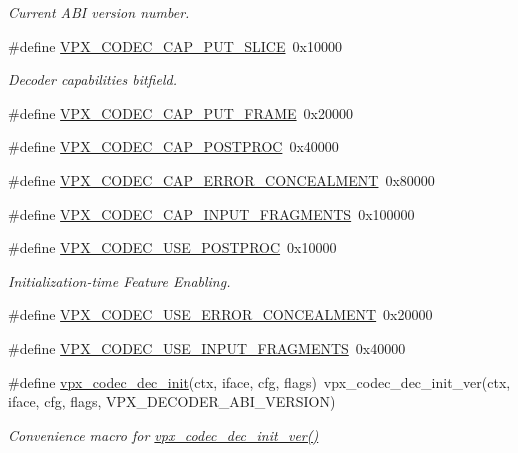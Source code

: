 \begin{DoxyCompactItemize}
\begin{DoxyCompactList}\small\item\em \-Current \-A\-B\-I version number. \end{DoxyCompactList}\item 
\#define \hyperlink{group__decoder_ga9e33b8ee81025d5fc3d01b0975ad5f96}{\-V\-P\-X\-\_\-\-C\-O\-D\-E\-C\-\_\-\-C\-A\-P\-\_\-\-P\-U\-T\-\_\-\-S\-L\-I\-C\-E}~0x10000
\begin{DoxyCompactList}\small\item\em \-Decoder capabilities bitfield. \end{DoxyCompactList}\item 
\#define \hyperlink{group__decoder_ga0ef59ca8067ac1dc8c8378042277ccc8}{\-V\-P\-X\-\_\-\-C\-O\-D\-E\-C\-\_\-\-C\-A\-P\-\_\-\-P\-U\-T\-\_\-\-F\-R\-A\-M\-E}~0x20000
\item 
\#define \hyperlink{group__decoder_ga7825ade982ab85a5583d3d8a669baa3b}{\-V\-P\-X\-\_\-\-C\-O\-D\-E\-C\-\_\-\-C\-A\-P\-\_\-\-P\-O\-S\-T\-P\-R\-O\-C}~0x40000
\item 
\#define \hyperlink{group__decoder_gac44cd9e4722e1eb32a37c3eaec8d97b9}{\-V\-P\-X\-\_\-\-C\-O\-D\-E\-C\-\_\-\-C\-A\-P\-\_\-\-E\-R\-R\-O\-R\-\_\-\-C\-O\-N\-C\-E\-A\-L\-M\-E\-N\-T}~0x80000
\item 
\#define \hyperlink{group__decoder_gae89cbd3e8089803c6f4a67fc67a8c531}{\-V\-P\-X\-\_\-\-C\-O\-D\-E\-C\-\_\-\-C\-A\-P\-\_\-\-I\-N\-P\-U\-T\-\_\-\-F\-R\-A\-G\-M\-E\-N\-T\-S}~0x100000
\item 
\#define \hyperlink{group__decoder_ga6fe14f30254aff769412b128b29664cc}{\-V\-P\-X\-\_\-\-C\-O\-D\-E\-C\-\_\-\-U\-S\-E\-\_\-\-P\-O\-S\-T\-P\-R\-O\-C}~0x10000
\begin{DoxyCompactList}\small\item\em \-Initialization-\/time \-Feature \-Enabling. \end{DoxyCompactList}\item 
\#define \hyperlink{group__decoder_ga520d7005e360202f5844982fa2392581}{\-V\-P\-X\-\_\-\-C\-O\-D\-E\-C\-\_\-\-U\-S\-E\-\_\-\-E\-R\-R\-O\-R\-\_\-\-C\-O\-N\-C\-E\-A\-L\-M\-E\-N\-T}~0x20000
\item 
\#define \hyperlink{group__decoder_ga378855a0318396d6e4e585bd3bacbf3f}{\-V\-P\-X\-\_\-\-C\-O\-D\-E\-C\-\_\-\-U\-S\-E\-\_\-\-I\-N\-P\-U\-T\-\_\-\-F\-R\-A\-G\-M\-E\-N\-T\-S}~0x40000
\item 
\#define \hyperlink{group__decoder_ga8c2f0b12f1bd4927eb3c68b01eab19d3}{vpx\-\_\-codec\-\_\-dec\-\_\-init}(ctx, iface, cfg, flags)~vpx\-\_\-codec\-\_\-dec\-\_\-init\-\_\-ver(ctx, iface, cfg, flags, \-V\-P\-X\-\_\-\-D\-E\-C\-O\-D\-E\-R\-\_\-\-A\-B\-I\-\_\-\-V\-E\-R\-S\-I\-O\-N)
\begin{DoxyCompactList}\small\item\em \-Convenience macro for \hyperlink{group__decoder_ga26fe82cf8fd697f885935cea53be964f}{vpx\-\_\-codec\-\_\-dec\-\_\-init\-\_\-ver()} \end{DoxyCompactList}\end{DoxyCompactItemize}
